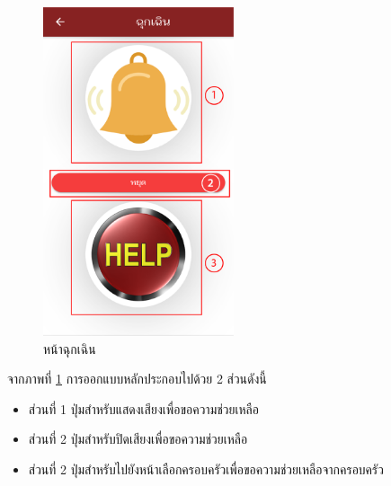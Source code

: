 		\begin{figure}[H]
			\centering
			\includegraphics[width=0.5\textwidth]{Figures/3/UI/help}
			\caption{หน้าฉุกเฉิน}
			\label{Fig:ฉุกเฉิน}
		\end{figure}
		จากภาพที่ \ref{Fig:ฉุกเฉิน} การออกแบบหลักประกอบไปด้วย 2 ส่วนดังนี้
		\begin{itemize}
			\item ส่วนที่ 1 ปุ่มสำหรับแสดงเสียงเพื่อขอความช่วยเหลือ
			\item ส่วนที่ 2 ปุ่มสำหรับปิดเสียงเพื่อขอความช่วยเหลือ
			\item ส่วนที่ 2 ปุ่มสำหรับไปยังหน้าเลือกครอบครัวเพื่อขอความช่วยเหลือจากครอบครัว
		\end{itemize}

